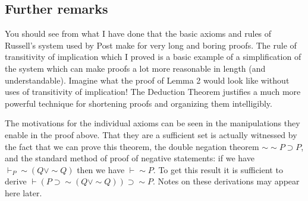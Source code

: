 \documentclass[12pt]{article}
\begin{document}
\subsection{Further remarks}

You should see from what I have done that the basic axioms and rules of Russell's system used by Post make for very long and boring proofs.  The rule of transitivity of implication which 
I proved is a basic example of a simplification of the system which can make proofs a lot more reasonable in length (and understandable).  Imagine what the proof of Lemma 2 would look like without uses of transitivity of implication!  The Deduction Theorem justifies a much more powerful technique for shortening proofs and organizing them intelligibly.

The motivations for the individual axioms can be seen in the manipulations they enable in the proof above.  That they are a sufficient set is actually witnessed by the fact that we can prove this theorem, the double negation theorem $\sim \sim P \supset P$,  and the standard method  of proof of negative statements:  if we have $\vdash_P \sim(Q \vee \sim Q)$ then we have $\vdash \sim P$.  To get this result it is sufficient to
derive $\vdash (P \supset \sim(Q \vee \sim Q)) \supset \sim P$.  Notes on these derivations may appear here later.
\end{document}
